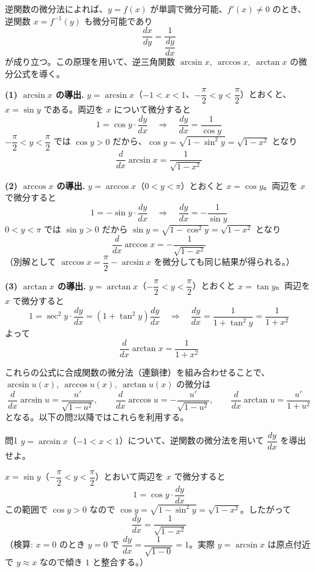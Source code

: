 \documentclass[a4paper,11pt]{article}
\begin{document}


\noindent
逆関数の微分法によれば、$y = f(x)$ が単調で微分可能、$f'(x) \neq 0$ のとき、逆関数 $x = f^{-1}(y)$ も微分可能であり
\[
\frac{dx}{dy} = \frac{1}{\dfrac{dy}{dx}}
\]
が成り立つ。この原理を用いて、逆三角関数 $\arcsin x,\ \arccos x,\ \arctan x$ の微分公式を導く。

\medskip
\noindent
\textbf{(1) $\arcsin x$ の導出.}\quad
$y = \arcsin x$（$-1 < x < 1$、$-\dfrac{\pi}{2} < y < \dfrac{\pi}{2}$）とおくと、$x = \sin y$ である。両辺を $x$ について微分すると
\[
1 = \cos y \cdot \frac{dy}{dx}
\quad\Longrightarrow\quad
\frac{dy}{dx} = \frac{1}{\cos y}
\]
$-\dfrac{\pi}{2} < y < \dfrac{\pi}{2}$ では $\cos y > 0$ だから、$\cos y = \sqrt{1-\sin^{2} y} = \sqrt{1-x^{2}}$ となり
\[
\frac{d}{dx}\arcsin x = \frac{1}{\sqrt{1-x^{2}}}
\]

\medskip
\noindent
\textbf{(2) $\arccos x$ の導出.}\quad
$y = \arccos x$（$0 < y < \pi$）とおくと $x = \cos y$。両辺を $x$ で微分すると
\[
1 = -\sin y \cdot \frac{dy}{dx}
\quad\Longrightarrow\quad
\frac{dy}{dx} = -\frac{1}{\sin y}
\]
$0 < y < \pi$ では $\sin y > 0$ だから $\sin y = \sqrt{1-\cos^{2} y} = \sqrt{1-x^{2}}$ となり
\[
\frac{d}{dx}\arccos x = -\frac{1}{\sqrt{1-x^{2}}}
\]
（別解として $\arccos x = \dfrac{\pi}{2} - \arcsin x$ を微分しても同じ結果が得られる。）

\medskip
\noindent
\textbf{(3) $\arctan x$ の導出.}\quad
$y = \arctan x$（$-\dfrac{\pi}{2} < y < \dfrac{\pi}{2}$）とおくと $x = \tan y$。両辺を $x$ で微分すると
\[
1 = \sec^{2} y \cdot \frac{dy}{dx} = (1+\tan^{2} y)\frac{dy}{dx}
\quad\Longrightarrow\quad
\frac{dy}{dx} = \frac{1}{1+\tan^{2} y} = \frac{1}{1+x^{2}}
\]
よって
\[
\frac{d}{dx}\arctan x = \frac{1}{1+x^{2}}
\]

\medskip
\noindent
これらの公式に合成関数の微分法（連鎖律）を組み合わせることで、$\arcsin u(x),\ \arccos u(x),\ \arctan u(x)$ の微分は
\[
\frac{d}{dx}\arcsin u = \frac{u'}{\sqrt{1-u^{2}}}, \qquad
\frac{d}{dx}\arccos u = -\frac{u'}{\sqrt{1-u^{2}}}, \qquad
\frac{d}{dx}\arctan u = \frac{u'}{1+u^{2}}
\]
となる。以下の問2以降ではこれらを利用する。

\clearpage
\begin{mondaiboxS}{問1}
$y = \arcsin x$（$-1 < x < 1$）について、逆関数の微分法を用いて $\dfrac{dy}{dx}$ を導出せよ。
\end{mondaiboxS}
\kaitou
$x = \sin y$（$-\dfrac{\pi}{2} < y < \dfrac{\pi}{2}$）とおいて両辺を $x$ で微分すると
\[
1 = \cos y \cdot \frac{dy}{dx}
\]
この範囲で $\cos y > 0$ なので $\cos y = \sqrt{1-\sin^{2}y} = \sqrt{1-x^{2}}$。したがって
\[
\boxed{\; \frac{dy}{dx} = \frac{1}{\sqrt{1-x^{2}}} \;}
\]
（検算: $x=0$ のとき $y=0$ で $\dfrac{dy}{dx} = \dfrac{1}{\sqrt{1-0}} = 1$。実際 $y=\arcsin x$ は原点付近で $y \approx x$ なので傾き $1$ と整合する。）
\end{document}
